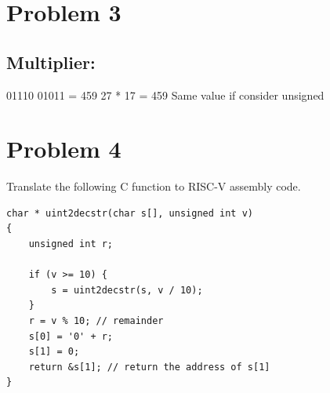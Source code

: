 \documentclass{article}
\begin{document}
\section*{Problem 3}
\subsection*{Multiplier:}
\begin{table}[h]
\end{table}
01110 01011 = 459
27 * 17 = 459
Same value if consider unsigned
\section*{Problem 4}
Translate the following C function to RISC-V assembly code.
\begin{lstlisting}
char * uint2decstr(char s[], unsigned int v)
{
    unsigned int r;

    if (v >= 10) {
        s = uint2decstr(s, v / 10);
    }
    r = v % 10; // remainder
    s[0] = '0' + r;
    s[1] = 0;
    return &s[1]; // return the address of s[1]
}
\end{lstlisting}
\end{document}
